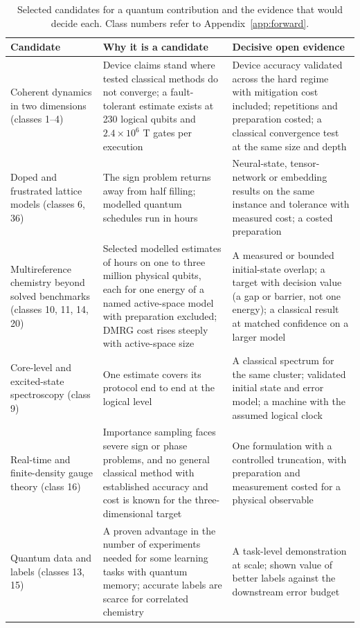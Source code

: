 \documentclass[10pt,a4paper]{article}
\begin{document}
\begin{table}[htbp]
\centering\small
\caption{Selected candidates for a quantum contribution and the evidence that would decide each. Class numbers refer to Appendix~\ref{app:forward}.}\label{tab:opps}
\begin{tabular}{@{}L{3.3cm} L{5.8cm} L{6.7cm}@{}}
\toprule
Candidate & Why it is a candidate & Decisive open evidence\\\midrule
Coherent dynamics in two dimensions (classes 1--4) & Device claims stand where tested classical methods do not converge; a fault-tolerant estimate exists at 230 logical qubits and $2.4\times10^6$ T gates per execution & Device accuracy validated across the hard regime with mitigation cost included; repetitions and preparation costed; a classical convergence test at the same size and depth\\
Doped and frustrated lattice models (classes 6, 36) & The sign problem returns away from half filling; modelled quantum schedules run in hours & Neural-state, tensor-network or embedding results on the same instance and tolerance with measured cost; a costed preparation\\
Multireference chemistry beyond solved benchmarks (classes 10, 11, 14, 20) & Selected modelled estimates of hours on one to three million physical qubits, each for one energy of a named active-space model with preparation excluded; DMRG cost rises steeply with active-space size & A measured or bounded initial-state overlap; a target with decision value (a gap or barrier, not one energy); a classical result at matched confidence on a larger model\\
Core-level and excited-state spectroscopy (class 9) & One estimate covers its protocol end to end at the logical level & A classical spectrum for the same cluster; validated initial state and error model; a machine with the assumed logical clock\\
Real-time and finite-density gauge theory (class 16) & Importance sampling faces severe sign or phase problems, and no general classical method with established accuracy and cost is known for the three-dimensional target & One formulation with a controlled truncation, with preparation and measurement costed for a physical observable\\
Quantum data and labels (classes 13, 15) & A proven advantage in the number of experiments needed for some learning tasks with quantum memory; accurate labels are scarce for correlated chemistry & A task-level demonstration at scale; shown value of better labels against the downstream error budget\\
\bottomrule
\end{tabular}
\end{table}
\end{document}
